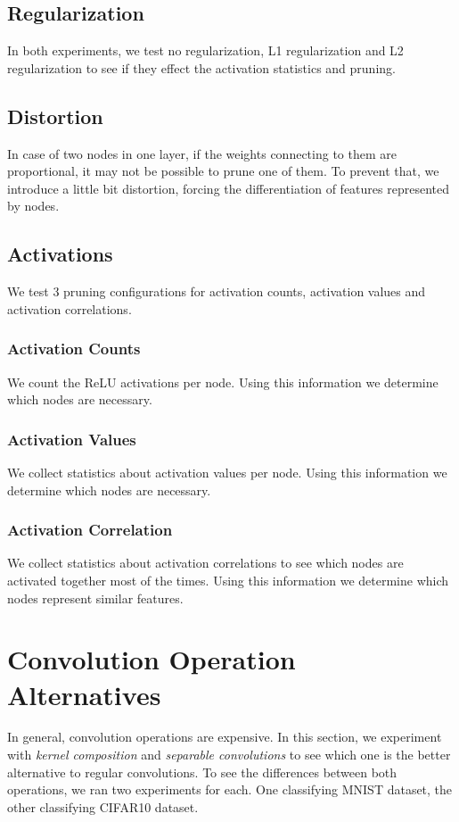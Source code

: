 \subsection{Regularization}
In both experiments, we test no regularization, L1 regularization and L2 regularization to see if they effect the activation statistics and pruning.

\subsection{Distortion}
In case of two nodes in one layer, if the weights connecting to them are proportional, it may not be possible to prune one of them. To prevent that, we introduce a little bit distortion, forcing the differentiation of features represented by nodes. 

\subsection{Activations}
We test 3 pruning configurations for activation counts, activation values and activation correlations. 

\subsubsection{Activation Counts}
We count the ReLU activations per node. Using this information we determine which nodes are necessary.

\subsubsection{Activation Values}
We collect statistics about activation values per node. Using this information we determine which nodes are necessary.

\subsubsection{Activation Correlation}
We collect statistics about activation correlations to see which nodes are activated together most of the times. Using this information we determine which nodes represent similar features. 


\section{Convolution Operation Alternatives}
In general, convolution operations are expensive. In this section, we experiment with \textit{kernel composition} and \textit{separable convolutions} to see which one is the better alternative to regular convolutions. To see the differences between both operations, we ran two experiments for each. One classifying MNIST dataset, the other classifying CIFAR10 dataset.

